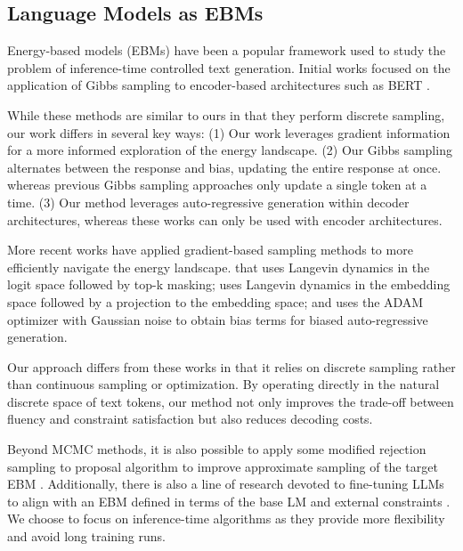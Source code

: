 \subsection{Language Models as EBMs}
Energy-based models (EBMs) have been a popular framework used to study the problem of inference-time controlled text generation. 
Initial works focused on the application of Gibbs sampling to encoder-based architectures such as BERT \citep{wang2019bert, goyal2021exposing, mireshghallah-etal-2022-mix}. 

While these methods are similar to ours in that they perform discrete sampling, our work differs in several key ways: (1) Our work leverages gradient information for a more informed exploration of the energy landscape.
(2) Our Gibbs sampling alternates between the response and bias, updating the entire response at once. whereas previous Gibbs sampling approaches only update a single token at a time. 
(3) Our method leverages auto-regressive generation within decoder architectures, whereas these works can only be used with encoder architectures.

More recent works have applied gradient-based sampling methods to more efficiently navigate the energy landscape. \citet{qin2022cold} that uses Langevin dynamics in the logit space followed by top-k masking; \citet{kumar2022gradient} uses Langevin dynamics in the embedding space followed by a projection to the embedding space; and \citet{liu2023bolt} uses the ADAM optimizer with Gaussian noise to obtain bias terms for biased auto-regressive generation. 

Our approach differs from these works in that it relies on discrete sampling rather than continuous sampling or optimization. By operating directly in the natural discrete space of text tokens, our method not only improves the trade-off between fluency and constraint satisfaction but also reduces decoding costs.

Beyond MCMC methods, it is also possible to apply some modified rejection sampling to proposal algorithm to improve approximate sampling of the target EBM \citep{eikema2022an}. Additionally, there is also a line of research devoted to fine-tuning LLMs to align with an EBM defined in terms of the base LM and external constraints \citep{khalifa2020distributional, korbak2022controlling, kruszewski-etal-2023-disco}. We choose to focus on inference-time algorithms as they provide more flexibility and avoid long training runs.
